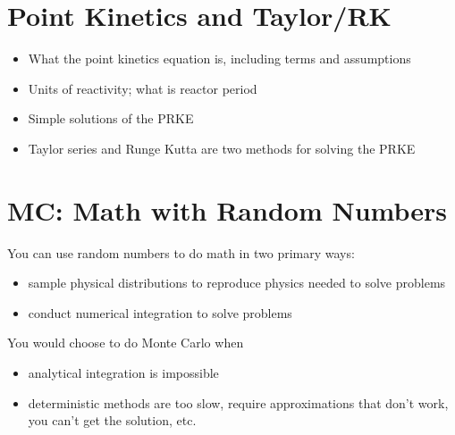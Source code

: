 \documentclass[12pt]{article}
\begin{document}
\section*{Point Kinetics and Taylor/RK}
\begin{itemize}
\item What the point kinetics equation is, including terms and assumptions
\item Units of reactivity; what is reactor period 
\item Simple solutions of the PRKE
\item Taylor series and Runge Kutta are two methods for solving the PRKE
\end{itemize}


\section*{MC: Math with Random Numbers}
You can use random numbers to do math in two primary ways: 
\begin{itemize}
\item sample physical distributions to reproduce physics needed to solve  problems
\item conduct numerical integration to solve problems
\end{itemize}

You would choose to do Monte Carlo when 
\begin{itemize}
\item analytical integration is impossible
\item deterministic methods are too slow, require approximations that don't work, you can't get the solution, etc.
\end{itemize} 
\end{document}
